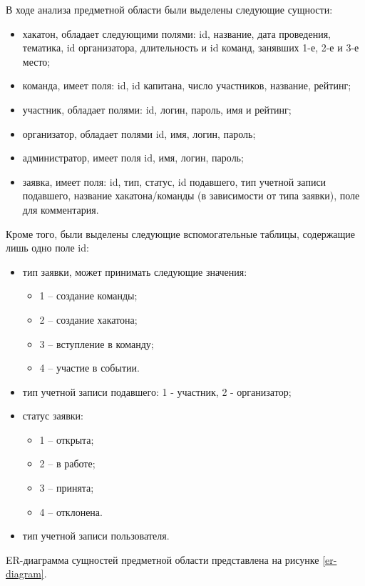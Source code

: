 В ходе анализа предметной области были выделены следующие сущности:
\begin{itemize}
    \item хакатон, обладает следующими полями: id, название, дата проведения, тематика, id организатора,  длительность и id команд, занявших 1-е, 2-е и 3-е место;
    \item команда, имеет поля: id, id капитана, число участников, название, рейтинг; 
    \item участник, обладает полями: id, логин, пароль, имя и рейтинг;
    \item организатор, обладает полями id, имя, логин, пароль;
    \item администратор, имеет поля id, имя, логин, пароль;
    \item заявка, имеет поля: id, тип, статус, id подавшего, тип учетной записи подавшего, название хакатона/команды (в зависимости от типа заявки), поле для комментария.
\end{itemize}

Кроме того, были выделены следующие вспомогательные таблицы, содержащие лишь одно поле id:
\begin{itemize}
    \item тип заявки, может принимать следующие значения: 
    \begin{itemize}
        \item 1 -- создание команды;
        \item 2 -- создание хакатона;
        \item 3 -- вступление в команду;
        \item 4 -- участие в событии.
    \end{itemize}
    \item тип учетной записи подавшего: 1 - участник, 2 - организатор;
    \item статус заявки:
    \begin{itemize}
        \item 1 -- открыта;
        \item 2 -- в работе;
        \item 3 -- принята;
        \item 4 -- отклонена.
    \end{itemize}
    \item тип учетной записи пользователя.
    
\end{itemize}

ER-диаграмма сущностей предметной области представлена на рисунке \ref{er-diagram}.


